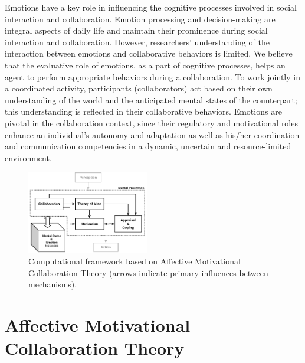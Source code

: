 \documentclass[letterpaper]{article}
\begin{document}
Emotions have a key role in influencing the cognitive processes involved in
social interaction and collaboration. Emotion processing and decision-making are
integral aspects of daily life and maintain their prominence during social
interaction and collaboration. However, researchers' understanding of the
interaction between emotions and collaborative behaviors is limited. We believe
that the evaluative role of emotions, as a part of cognitive processes, helps an
agent to perform appropriate behaviors during a collaboration. To work jointly
in a coordinated activity, participants (collaborators) act based on their own
understanding of the world and the anticipated mental states of the counterpart;
this understanding is reflected in their collaborative behaviors. Emotions are
pivotal in the collaboration context, since their regulatory and motivational
roles enhance an individual's autonomy and adaptation as well as his/her
coordination and communication competencies in a dynamic, uncertain and
resource-limited environment.

\vspace*{-1mm}
\begin{figure}[tbh]
  \centering
  \includegraphics[width=0.474\textwidth]{figure/theory-general-croped.pdf}
  \caption{{\fontsize{8.5}{9}\selectfont Computational framework based on
  Affective Motivational Collaboration Theory (arrows indicate primary
  influences between mechanisms).}}
  \label{fig:cpm}
\end{figure}

\vspace*{-7mm}
\section{Affective Motivational Collaboration Theory}
\end{document}
